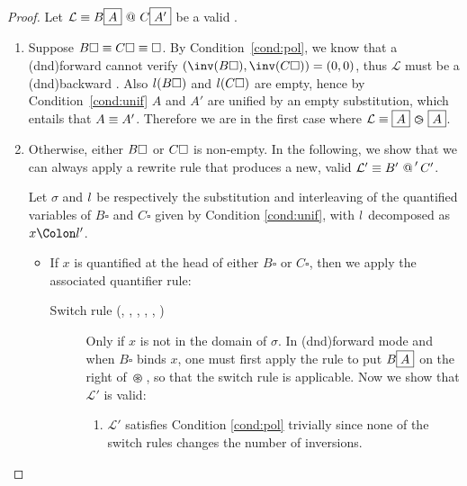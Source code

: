 \begin{proof}
  Let $\mathcal{L} \equiv B\fbox{$A$} \operatorname{\,@\,} C\fbox{$A'$}$ be a valid .\\
  \begin{enumerate}[itemsep=0.8em]
    \item Suppose $B\square \equiv C\square \equiv \square$. By
    Condition~\ref{cond:pol}, we know that a \kl(dnd){forward}  cannot verify
    $(\inv(B\square), \inv(C\square)) = (0,0)$, thus $\mathcal{L}$ must be a
    \kl(dnd){backward} . Also $l(B\square)$ and $l(C\square)$ are empty,
    hence by Condition~\ref{cond:unif} $A$ and $A'$ are unified by an empty
    substitution, which entails that $A \equiv A'$. Therefore we are in the
    first case where $\mathcal{L} \equiv \fbox{$A$} \operatorname{\,\varogreaterthan\,} \fbox{$A$}$.

    \item Otherwise, either $B\square$ or $C\square$ is non-empty. In the following,
    we show that we can always apply a rewrite rule that produces a new, valid
     $\mathcal{L'} \equiv B' \operatorname{\,@\,}' C'$.
    
    Let $\sigma$ and $l$ be respectively the substitution and interleaving
    of the quantified variables of $B\square$ and $C\square$ given by Condition
    \ref{cond:unif}, with $l$ decomposed as $x \Colon \lvar'$.
    
    \begin{itemize}
      \item If $x$ is quantified at the head of either $B\square$ or $C\square$,
        then we apply the associated quantifier rule:

        \begin{description}
          \item[Switch rule (, ,
          , , ,
          )] Only if $x$ is not in the domain of $\sigma$. In
          \kl(dnd){forward} mode and when $B\square$ binds $x$, one must first apply the
          rule  to put $B\fbox{$A$}$ on the right of $\operatorname{\,\varoast\,}$, so
          that the switch rule is applicable. Now we show that $\mathcal{L'}$ is
          valid:

          \begin{enumerate}[itemsep=0.4em]
            \renewcommand{\labelenumii}{\theenumii}
            \renewcommand{\theenumii}{\arabic{enumii}.}

            \item $\mathcal{L'}$ satisfies Condition \ref{cond:pol} trivially
            since none of the switch rules changes the number of inversions.


\end{enumerate}
\end{description}
\end{itemize}
\end{enumerate}
\end{proof}
